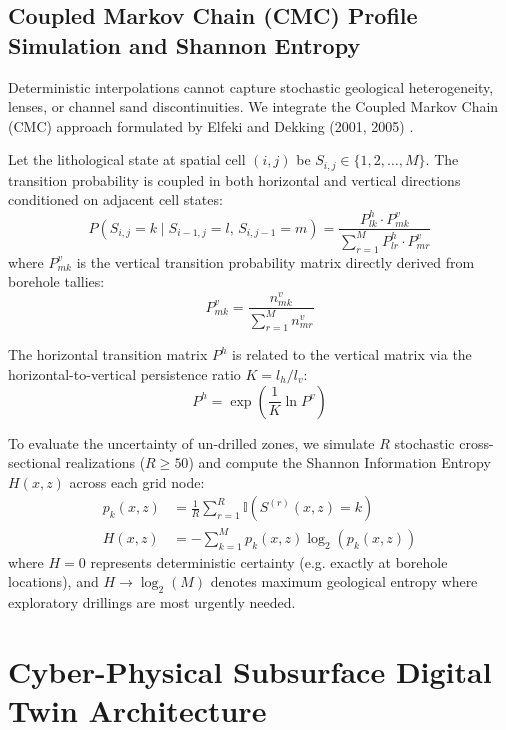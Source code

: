 \documentclass[11pt,a4paper]{article}
\begin{document}
\subsection{Coupled Markov Chain (CMC) Profile Simulation and Shannon Entropy}

Deterministic interpolations cannot capture stochastic geological heterogeneity, lenses, or channel sand discontinuities. We integrate the Coupled Markov Chain (CMC) approach formulated by Elfeki and Dekking (2001, 2005) \cite{elfeki2001modelling,elfeki2005reducing}. 

Let the lithological state at spatial cell $(i, j)$ be $S_{i, j} \in \{1, 2, \dots, M\}$. The transition probability is coupled in both horizontal and vertical directions conditioned on adjacent cell states:
\begin{equation}
P\left(S_{i, j} = k \mid S_{i-1, j} = l, \, S_{i, j-1} = m\right) = \frac{P_{lk}^h \cdot P_{mk}^v}{\sum_{r=1}^M P_{lr}^h \cdot P_{mr}^v}
\end{equation}
where $P_{mk}^v$ is the vertical transition probability matrix directly derived from borehole tallies:
\begin{equation}
P_{mk}^v = \frac{n_{mk}^v}{\sum_{r=1}^M n_{mr}^v}
\end{equation}

The horizontal transition matrix $P^h$ is related to the vertical matrix via the horizontal-to-vertical persistence ratio $K = l_h / l_v$:
\begin{equation}
P^h = \exp\left(\frac{1}{K} \ln P^v\right)
\end{equation}

To evaluate the uncertainty of un-drilled zones, we simulate $R$ stochastic cross-sectional realizations ($R \ge 50$) and compute the Shannon Information Entropy $H(x, z)$ across each grid node:
\begin{align}
p_k(x, z) &= \frac{1}{R}\sum_{r=1}^R \mathbb{I}\left(S^{(r)}(x, z) = k\right) \\
H(x, z) &= -\sum_{k=1}^M p_k(x, z) \log_2\left(p_k(x, z)\right)
\end{align}
where $H = 0$ represents deterministic certainty (e.g. exactly at borehole locations), and $H \to \log_2(M)$ denotes maximum geological entropy where exploratory drillings are most urgently needed.

\section{Cyber-Physical Subsurface Digital Twin Architecture}
\end{document}
